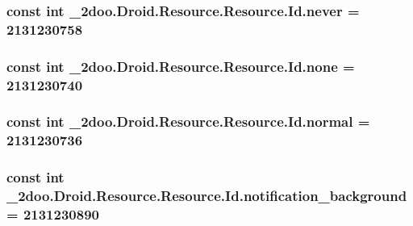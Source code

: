 \hypertarget{class__2doo_1_1_droid_1_1_resource_1_1_id_74794284d8e8d2ed5a7f0e2efb1dbea6}{
\subsubsection[{never}]{\setlength{\rightskip}{0pt plus 5cm}const int \_\-2doo.Droid.Resource.Resource.Id.never = 2131230758}}
\label{class__2doo_1_1_droid_1_1_resource_1_1_id_74794284d8e8d2ed5a7f0e2efb1dbea6}


\hypertarget{class__2doo_1_1_droid_1_1_resource_1_1_id_381e5caed25b976b0325a333433491dd}{
\subsubsection[{none}]{\setlength{\rightskip}{0pt plus 5cm}const int \_\-2doo.Droid.Resource.Resource.Id.none = 2131230740}}
\label{class__2doo_1_1_droid_1_1_resource_1_1_id_381e5caed25b976b0325a333433491dd}


\hypertarget{class__2doo_1_1_droid_1_1_resource_1_1_id_22cd358dc080de5118595c5b8655f7aa}{
\subsubsection[{normal}]{\setlength{\rightskip}{0pt plus 5cm}const int \_\-2doo.Droid.Resource.Resource.Id.normal = 2131230736}}
\label{class__2doo_1_1_droid_1_1_resource_1_1_id_22cd358dc080de5118595c5b8655f7aa}


\hypertarget{class__2doo_1_1_droid_1_1_resource_1_1_id_71dc10e3b13f3e2b62da57ca42ebc14d}{
\subsubsection[{notification\_\-background}]{\setlength{\rightskip}{0pt plus 5cm}const int \_\-2doo.Droid.Resource.Resource.Id.notification\_\-background = 2131230890}}
\label{class__2doo_1_1_droid_1_1_resource_1_1_id_71dc10e3b13f3e2b62da57ca42ebc14d}


